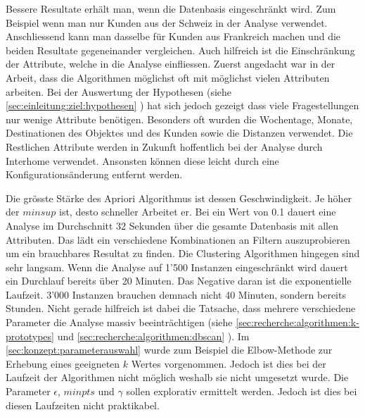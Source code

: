 Bessere Resultate erhält man, wenn die Datenbasis eingeschränkt wird. Zum Beispiel wenn man nur Kunden aus der Schweiz in der Analyse verwendet. Anschliessend kann man dasselbe für Kunden aus Frankreich machen und die beiden Resultate gegeneinander vergleichen. Auch hilfreich ist die Einschränkung der Attribute, welche in die Analyse einfliessen. Zuerst angedacht war in der Arbeit, dass die Algorithmen möglichst oft mit möglichst vielen Attributen arbeiten. Bei der Auswertung der Hypothesen (siehe \cref{sec:einleitung:ziel:hypothesen} ) hat sich jedoch gezeigt dass viele Fragestellungen nur wenige Attribute benötigen. Besonders oft wurden die Wochentage, Monate, Destinationen des Objektes und des Kunden sowie die Distanzen verwendet. Die Restlichen Attribute werden in Zukunft hoffentlich bei der Analyse durch Interhome verwendet. Ansonsten können diese leicht durch eine Konfigurationsänderung entfernt werden.

Die grösste Stärke des Apriori Algorithmus ist dessen Geschwindigkeit. Je höher der $minsup$ ist, desto schneller Arbeitet er. Bei ein Wert von 0.1 dauert eine Analyse im Durchschnitt 32 Sekunden über die gesamte Datenbasis mit allen Attributen. Das lädt ein verschiedene Kombinationen an Filtern auszuprobieren um ein brauchbares Resultat zu finden. Die Clustering Algorithmen hingegen sind sehr langsam. Wenn die Analyse auf 1'500 Instanzen eingeschränkt wird dauert ein Durchlauf bereits über 20 Minuten. Das Negative daran ist die exponentielle Laufzeit. 3'000 Instanzen brauchen demnach nicht 40 Minuten, sondern bereits Stunden. Nicht gerade hilfreich ist dabei die Tatsache, dass mehrere verschiedene Parameter die Analyse massiv beeinträchtigen (siehe \cref{sec:recherche:algorithmen:k-prototypes}  und \cref{sec:recherche:algorithmen:dbscan} ). Im \cref{sec:konzept:parameterauswahl}  wurde zum Beispiel die Elbow-Methode zur Erhebung eines geeigneten $k$ Wertes vorgenommen. Jedoch ist dies bei der Laufzeit der Algorithmen nicht möglich weshalb sie nicht umgesetzt wurde. Die Parameter $\epsilon$, $minpts$ und $\gamma$ sollen explorativ ermittelt werden. Jedoch ist dies bei diesen Laufzeiten nicht praktikabel. 

